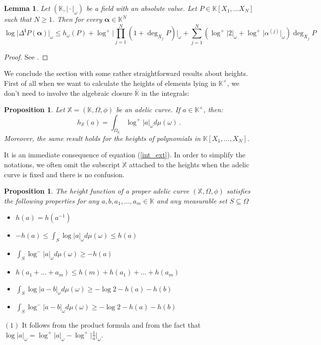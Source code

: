 \documentclass[10 pt,a4paper]{article}
\theoremstyle{plain}
\newtheorem{prop}[thm]{Proposition}
\newtheorem{lem}[thm]{Lemma}
\theoremstyle{definition}
\theoremstyle{named}
\begin{document}
\begin{lem}\label{corvajalemmepag166} Let $(\mathbb K, \vert\cdot\vert_\omega)$ be a field with an absolute value. Let $P\in\mathbb K[X_1,\dots X_N]$ such that $N\geq 1$. Then for every $\bm{\alpha}\in\mathbb K^N$
$${\log}\vert \Delta^{{\bm i}}P(\bm{\alpha})\vert_\omega\leq 
h_\omega(P)+\log^+\bigg\lvert\prod^N_{j=1}\left(1+\deg_{X_j} P\right)\bigg\rvert_\omega+\sum_{j=1}^{N}(\log^+\vert 2\vert_\omega+{\log}^+\vert\alpha^{(j)} \vert_\omega){\deg}_{X_j}P
$$
\end{lem}
\begin{proof} See  \cite[Lemme, page 166]{C}.
\end{proof}

We conclude the section with some rather straightforward results about heights. First  of all when we want to calculate the heights of elements lying in $\mathbb K^\times$, we don't need to involve the algebraic closure $\overline{\mathbb K}$ in the integrals:
\begin{prop} Let $\mathbb X=(\mathbb K, \Omega,\phi)$ be an adelic curve. If $a\in\mathbb K^\times$, then:
$$h_{\mathbb X}(a)=\int_{\Omega_\mathbb{K}} \log^+|a|_{\omega} d\mu(\omega)\,.$$
Moreover, the same result holds for the heights of polynomials in $\mathbb K[X_1,\ldots, X_N]$.
\end{prop} 
\proof
It is an immediate consequence of equation (\ref{int_ext}).
\endproof
In order to simplify the notations, we often omit the subscript $\mathbb X$ attached to the heights when the adelic curve is fixed and there is no confusion.
\begin{prop}\label{properties}
The height function of a proper adelic curve $(\mathbb X, \Omega,\phi)$ satisfies the following properties for any $a,b,a_1,\ldots,a_m\in\mathbb K$ and  any measurable set $S\subseteq\Omega$
\begin{itemize}
\item[$(1)$] $h(a)=h(a^{-1})$
\item[$(2)$]  $-h(a)\le\int_S\log\vert a\vert_\omega d\mu(\omega)\le h(a)$
\item[$(3)$] $\int_S\log^-\vert a\vert_\omega d\mu(\omega)\ge -h(a)$
\item[$(4)$]  $h(a_1+\ldots +a_m)\le h(m)+h(a_1)+\ldots+h(a_m)$
\item[$(5)$]  $\int_S\log \vert a-b\vert_\omega d\mu(\omega)\ge -\log 2- h(a)-h(b)$
\item[$(6)$]$\int_S\log^- \vert a-b\vert_\omega d\mu(\omega)\ge -\log 2- h(a)-h(b)$
\end{itemize}
\end{prop}
\proof $(1)$ It follows from the product formula and from the fact that $\log\vert a\vert_\omega=\log^+\vert a\vert_\omega-\log^+\vert \frac{1}{a}\vert_\omega$.
\end{document}
